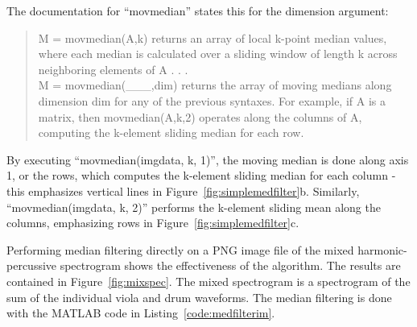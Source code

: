 \documentclass[letter,12pt]{article}
\begin{document}
The documentation for ``movmedian'' \cite{movmedian} states this for the dimension argument:

\begin{quote}
M = movmedian(A,k) returns an array of local k-point median values, where each median is calculated over a sliding window of length k across neighboring elements of A . . .\\
M = movmedian(\_\_\_,dim) returns the array of moving medians along dimension dim for any of the previous syntaxes. For example, if A is a matrix, then movmedian(A,k,2) operates along the columns of A, computing the k-element sliding median for each row.
\end{quote}

By executing ``movmedian(imgdata, k, 1)'', the moving median is done along axis 1, or the rows, which computes the k-element sliding median for each column - this emphasizes vertical lines in Figure~\ref{fig:simplemedfilter}b. Similarly, ``movmedian(imgdata, k, 2)'' performs the k-element sliding mean along the columns, emphasizing rows in Figure~\ref{fig:simplemedfilter}c.

\vfill
\clearpage %

Performing median filtering directly on a PNG image file of the mixed harmonic-percussive spectrogram shows the effectiveness of the algorithm. The results are contained in Figure~\ref{fig:mixspec}. The mixed spectrogram is a spectrogram of the sum of the individual viola and drum waveforms. The median filtering is done with the MATLAB code in Listing~\ref{code:medfilterim}.
\end{document}
